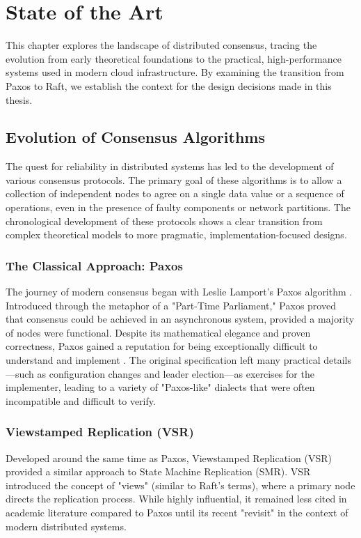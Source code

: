 \chapter{State of the Art}
\label{ch:state_of_the_art}

This chapter explores the landscape of distributed consensus, tracing the evolution from early theoretical foundations to the practical, high-performance systems used in modern cloud infrastructure. By examining the transition from Paxos to Raft, we establish the context for the design decisions made in this thesis.

\section{Evolution of Consensus Algorithms}
The quest for reliability in distributed systems has led to the development of various consensus protocols.
The primary goal of these algorithms is to allow a collection of independent nodes to agree on a single data value or a sequence of operations, even in the presence of faulty components or network partitions.
The chronological development of these protocols shows a clear transition from complex theoretical models to more pragmatic, implementation-focused designs.

\subsection{The Classical Approach: Paxos}
The journey of modern consensus began with Leslie Lamport's Paxos algorithm \cite{Lamport1998}.
Introduced through the metaphor of a "Part-Time Parliament," Paxos proved that consensus could be achieved in an asynchronous system, provided a majority of nodes were functional.
Despite its mathematical elegance and proven correctness, Paxos gained a reputation for being exceptionally difficult to understand and implement \cite{PaxosSimple}.
The original specification left many practical details—such as configuration changes and leader election—as exercises for the implementer, leading to a variety of "Paxos-like" dialects that were often incompatible and difficult to verify.

\subsection{Viewstamped Replication (VSR)}
Developed around the same time as Paxos, Viewstamped Replication (VSR) \cite{LiskovVSR} provided a similar approach to State Machine Replication (SMR).
VSR introduced the concept of "views" (similar to Raft's terms), where a primary node directs the replication process.
While highly influential, it remained less cited in academic literature compared to Paxos until its recent "revisit" in the context of modern distributed systems.

